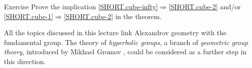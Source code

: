 \begin{thm}{Exercise}\label{ex:cube-infty=>cube-2} Prove the implication \ref{SHORT.cube-infty}$\Rightarrow$\ref{SHORT.cube-2} and/or \ref{SHORT.cube-1}$\Rightarrow$\ref{SHORT.cube-2} in the theorem.
\end{thm}


All the topics discussed in this lecture link Alexandrov geometry with the fundamental group.
The theory of {}\emph{hyperbolic groups}, 
a branch of {}\emph{geometric group theory}, 
introduced by 
Mikhael Gromov \cite{gromov-1987},
could be considered as a further step in this direction.


